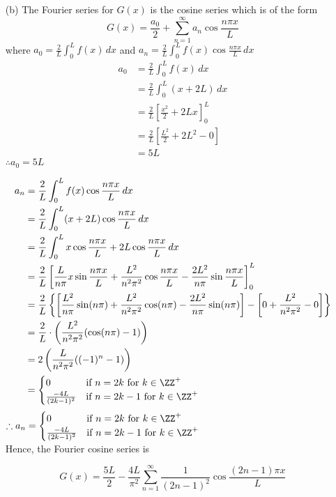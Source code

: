 \documentclass[12pt]{scrartcl}
\newcommand{\disp}{\displaystyle}
\begin{document}
\begin{soln}
\begin{enumerate}
 \item[(b)] The Fourier series for $G(x)$ is the  cosine series which is of the form 
	\[
	G(x) = \frac{a_0}{2} + \sum_{n=1}^{\infty} a_n \cos \frac{n\pi x}{L} 
\]
where $\disp a_0 = \frac{2}{L} \int_{0}^{L} f(x) \, dx$ and $\disp a_n = \frac2L \int_{0}^{L} f(x) \cos \frac{n\pi x}{L}\, dx$ \\
\begin{align*}
	a_0 & = \frac{2}{L} \int_{0}^{L} f(x) \, dx \\
		& = \frac{2}{L} \int_{0}^{L} (x + 2L) \, dx \\
		& = \frac2L \left[ \frac{x^2}{2} + 2Lx \right]_{0}^{L} \\
		& = \frac2L \left[ \frac{L^2}{2} + 2L^2 - 0 \right] \\
		& = 5L
\end{align*}
$\therefore \disp a_0 = 5L$

\begin{align*}
	a_n & = \frac2L \int_{0}^{L} f(x) \cos \frac{n\pi x}{L}\, dx \\
		& = \frac2L \int_{0}^{L} (x + 2L) \cos \frac{n\pi x}{L}\, dx \\
		& = \frac2L \int_{0}^{L} x \cos \frac{n\pi x}{L} + 2L \cos \frac{n\pi x}{L} \, dx \\
		& = \frac2L \left[ \frac{L}{n\pi}x\sin \frac{n\pi x}{L} + \frac{L^2}{n^2\pi^2}\cos \frac{n\pi x}{L} - \frac{2L^2}{n\pi} \sin \frac{n\pi x}{L} \right]_{0}^{L} \\
		& = \frac2L \left\{ \left[ \frac{L^2}{n\pi}\sin (n\pi) + \frac{L^2}{n^2\pi^2}\cos (n\pi) - \frac{2L^2}{n\pi} \sin (n\pi) \right] - \left[ 0 + \frac{L^2}{n^2 \pi^2} - 0 \right] \right\} \\
		& = \frac2L \cdot \left( \frac{L^2}{n^2\pi^2} (\cos(n\pi) - 1) \right) \\
		& = 2 \left( \frac{L}{n^2\pi^2} ((-1)^n - 1) \right) \\
		& = \begin{cases}
				0 & \text{if $n = 2k$ for $k \in \ZZ^+$ } \\
				\frac{-4L}{(2k - 1)^2} & \text{if $n = 2k -1 $ for $k \in \ZZ^+$}
\end{cases}
\end{align*}
$\disp \therefore a_n = \begin{cases}
				0 & \text{if $n = 2k$ for $k \in \ZZ^+$ } \\
				\frac{-4L}{(2k - 1)^2} & \text{if $n = 2k -1 $ for $k \in \ZZ^+$} 
\end{cases}$ \\
Hence, the Fourier cosine series is 
\begin{mdframed}[style=mybox]
	\[
	G(x) = \frac{5L}{2} - \frac{4L}{\pi^2} \sum_{n = 1}^{\infty} \frac{1}{(2n-1)^2} \cos \frac{(2n - 1)\pi x}{L}
\]
\end{mdframed}
\end{enumerate}
\end{soln}
\end{document}
